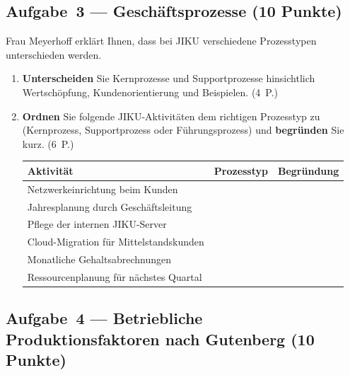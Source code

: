 \documentclass[11pt, a4paper]{article}
\begin{document}
\subsection*{Aufgabe~3 --- Geschäftsprozesse (10 Punkte)}

Frau Meyerhoff erklärt Ihnen, dass bei JIKU verschiedene Prozesstypen unterschieden werden.

\begin{enumerate}[label=(\alph*)]
  \item \textbf{Unterscheiden} Sie Kernprozesse und Supportprozesse hinsichtlich
  Wertschöpfung, Kundenorientierung und Beispielen. \hfill (4~P.)

  \vspace{6cm}

  \item \textbf{Ordnen} Sie folgende JIKU-Aktivitäten dem richtigen Prozesstyp zu
  (Kernprozess, Supportprozess oder Führungsprozess) und \textbf{begründen} Sie kurz. \hfill (6~P.)

  \bigskip

  \noindent
  \begin{tabular}{|p{6.5cm}|p{2.5cm}|p{4.5cm}|}
  \hline
  \textbf{Aktivität} & \textbf{Prozesstyp} & \textbf{Begründung}\\
  \hline
  Netzwerkeinrichtung beim Kunden & & \\[0.8cm]
  \hline
  Jahresplanung durch Geschäftsleitung & & \\[0.8cm]
  \hline
  Pflege der internen JIKU-Server & & \\[0.8cm]
  \hline
  Cloud-Migration für Mittelstandskunden & & \\[0.8cm]
  \hline
  Monatliche Gehaltsabrechnungen & & \\[0.8cm]
  \hline
  Ressourcenplanung für nächstes Quartal & & \\[0.8cm]
  \hline
  \end{tabular}
\end{enumerate}

\subsection*{Aufgabe~4 --- Betriebliche Produktionsfaktoren nach Gutenberg (10 Punkte)}
\end{document}

